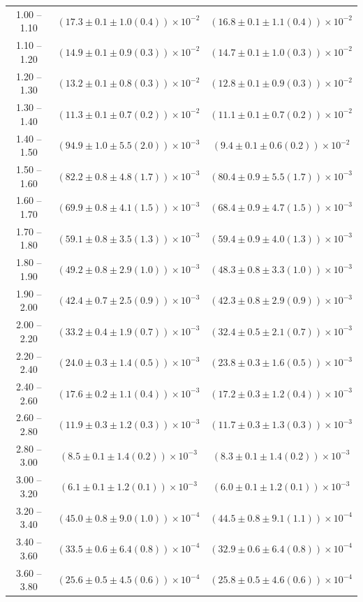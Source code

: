 \begin{table}
\begin{center}
\begin{tabular}{ c | c c }
1.00 -- 1.10 & $(17.3\pm0.1\pm1.0(0.4))\times10^{-2}$ & $(16.8\pm0.1\pm1.1(0.4))\times10^{-2}$ \\ 
1.10 -- 1.20 & $(14.9\pm0.1\pm0.9(0.3))\times10^{-2}$ & $(14.7\pm0.1\pm1.0(0.3))\times10^{-2}$ \\ 
1.20 -- 1.30 & $(13.2\pm0.1\pm0.8(0.3))\times10^{-2}$ & $(12.8\pm0.1\pm0.9(0.3))\times10^{-2}$ \\ 
1.30 -- 1.40 & $(11.3\pm0.1\pm0.7(0.2))\times10^{-2}$ & $(11.1\pm0.1\pm0.7(0.2))\times10^{-2}$ \\ 
1.40 -- 1.50 & $(94.9\pm1.0\pm5.5(2.0))\times10^{-3}$ & $(9.4\pm0.1\pm0.6(0.2))\times10^{-2}$ \\ 
1.50 -- 1.60 & $(82.2\pm0.8\pm4.8(1.7))\times10^{-3}$ & $(80.4\pm0.9\pm5.5(1.7))\times10^{-3}$ \\ 
1.60 -- 1.70 & $(69.9\pm0.8\pm4.1(1.5))\times10^{-3}$ & $(68.4\pm0.9\pm4.7(1.5))\times10^{-3}$ \\ 
1.70 -- 1.80 & $(59.1\pm0.8\pm3.5(1.3))\times10^{-3}$ & $(59.4\pm0.9\pm4.0(1.3))\times10^{-3}$ \\ 
1.80 -- 1.90 & $(49.2\pm0.8\pm2.9(1.0))\times10^{-3}$ & $(48.3\pm0.8\pm3.3(1.0))\times10^{-3}$ \\ 
1.90 -- 2.00 & $(42.4\pm0.7\pm2.5(0.9))\times10^{-3}$ & $(42.3\pm0.8\pm2.9(0.9))\times10^{-3}$ \\ 
2.00 -- 2.20 & $(33.2\pm0.4\pm1.9(0.7))\times10^{-3}$ & $(32.4\pm0.5\pm2.1(0.7))\times10^{-3}$ \\ 
2.20 -- 2.40 & $(24.0\pm0.3\pm1.4(0.5))\times10^{-3}$ & $(23.8\pm0.3\pm1.6(0.5))\times10^{-3}$ \\ 
2.40 -- 2.60 & $(17.6\pm0.2\pm1.1(0.4))\times10^{-3}$ & $(17.2\pm0.3\pm1.2(0.4))\times10^{-3}$ \\ 
2.60 -- 2.80 & $(11.9\pm0.3\pm1.2(0.3))\times10^{-3}$ & $(11.7\pm0.3\pm1.3(0.3))\times10^{-3}$ \\ 
2.80 -- 3.00 & $(8.5\pm0.1\pm1.4(0.2))\times10^{-3}$ & $(8.3\pm0.1\pm1.4(0.2))\times10^{-3}$ \\ 
3.00 -- 3.20 & $(6.1\pm0.1\pm1.2(0.1))\times10^{-3}$ & $(6.0\pm0.1\pm1.2(0.1))\times10^{-3}$ \\ 
3.20 -- 3.40 & $(45.0\pm0.8\pm9.0(1.0))\times10^{-4}$ & $(44.5\pm0.8\pm9.1(1.1))\times10^{-4}$ \\ 
3.40 -- 3.60 & $(33.5\pm0.6\pm6.4(0.8))\times10^{-4}$ & $(32.9\pm0.6\pm6.4(0.8))\times10^{-4}$ \\ 
3.60 -- 3.80 & $(25.6\pm0.5\pm4.5(0.6))\times10^{-4}$ & $(25.8\pm0.5\pm4.6(0.6))\times10^{-4}$ \\ 

\end{tabular}
\end{center}
\end{table}
